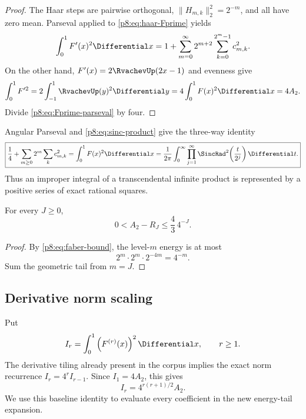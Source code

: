 \documentclass[11pt]{article}
\theoremstyle{definition}
\theoremstyle{remark}
\begin{document}
\begin{proof}
The Haar steps are pairwise orthogonal,
$\|H_{m,k}\|_2^2=2^{-m}$, and all have zero mean.  Parseval applied to
\eqref{p8:eq:haar-Fprime} yields
\begin{equation}
 \int_0^1F'(x)^2\Differential x
 =1+\sum_{m=0}^\infty2^{m+2}\sum_{k=0}^{2^m-1}c_{m,k}^2. \label{p8:eq:Fprime-parseval}
\end{equation}
On the other hand, $F'(x)=2\RvachevUp(2x-1)$ and evenness give
\[
 \int_0^1F'^2
 =2\int_{-1}^{1}\RvachevUp(y)^2\Differential y
 =4\int_0^1F(x)^2\Differential x=4A_2.
\]
Divide \eqref{p8:eq:Fprime-parseval} by four.
\end{proof}

Angular Parseval and \eqref{p8:eq:sinc-product} give the three-way identity
\begin{equation}
 \boxed{\displaystyle
 \frac14+\sum_{m\ge0}2^m\sum_kc_{m,k}^2
 =\int_0^1F(x)^2\Differential x
 =\frac1{2\pi}\int_0^\infty
   \prod_{j=1}^\infty\SincRad^2\!\left(\frac{t}{2^j}\right)\Differential t.} \label{p8:eq:A2-three-way}
\end{equation}
Thus an improper integral of a transcendental infinite product is represented
by a positive series of exact rational squares.

\begin{corollary}
\label{p8:cor:A2-tail-bound}
For every $J\ge0$,
\begin{equation}
 0<A_2-R_J\le\frac43\,4^{-J}.                            \label{p8:eq:A2-tail-bound}
\end{equation}
\end{corollary}

\begin{proof}
By \eqref{p8:eq:faber-bound}, the level-$m$ energy is at most
\[
 2^m\cdot2^m\cdot2^{-4m}=4^{-m}.
\]
Sum the geometric tail from $m=J$.
\end{proof}

\subsection{Derivative norm scaling}

Put
\begin{equation}
 I_r=\int_0^1\left(F^{(r)}(x)\right)^2\Differential x,
 \qquad r\ge1.                                           \label{p8:eq:Ir-definition}
\end{equation}
The derivative tiling already present in the corpus implies the exact norm
recurrence $I_r=4^rI_{r-1}$.  Since $I_1=4A_2$, this gives
\begin{equation}
 \boxed{\displaystyle
 I_r=4^{r(r+1)/2}A_2.}                                   \label{p8:eq:derivative-norm-scaling}
\end{equation}
We use this baseline identity to evaluate every coefficient in the new
energy-tail expansion.
\end{document}
